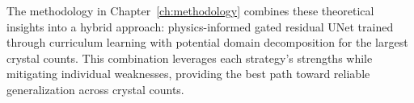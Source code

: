 The methodology in Chapter~\ref{ch:methodology} combines these theoretical insights into a hybrid approach: physics-informed gated residual UNet trained through curriculum learning with potential domain decomposition for the largest crystal counts. This combination leverages each strategy's strengths while mitigating individual weaknesses, providing the best path toward reliable generalization across crystal counts.